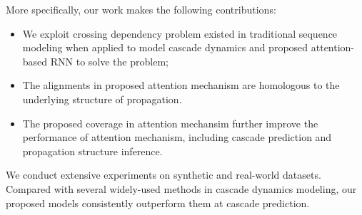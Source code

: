 More specifically, our work makes the following contributions:
\begin{itemize}
  \item We exploit crossing dependency problem existed in traditional sequence
  modeling when applied to model cascade dynamics and proposed attention-based
  RNN to solve the problem;
  \item The alignments in proposed attention mechanism are homologous to the
  underlying structure of propagation.
  \item The proposed coverage in attention mechansim further improve the
  performance of attention mechanism, including cascade prediction and
  propagation structure inference.
\end{itemize}
% 
% 
We conduct extensive experiments on synthetic
and real-world datasets. Compared with several widely-used methods in cascade
dynamics modeling, our proposed models consistently outperform them at
cascade prediction.


% 

% 
% 

% 
